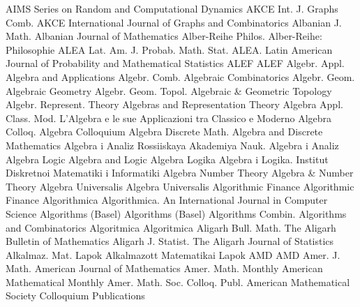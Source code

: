 {AIMS Series on Random and Computational Dynamics}
{AKCE Int. J. Graphs Comb.}
{AKCE International Journal of Graphs and Combinatorics}
{Albanian J. Math.}
{Albanian Journal of Mathematics}
{Alber-Reihe Philos.}
{Alber-Reihe: Philosophie}
{ALEA Lat. Am. J. Probab. Math. Stat.}
{ALEA. Latin American Journal of Probability and Mathematical Statistics}
{ALEF}
{ALEF}
{Algebr. Appl.}
{Algebra and Applications}
{Algebr. Comb.}
{Algebraic Combinatorics}
{Algebr. Geom.}
{Algebraic Geometry}
{Algebr. Geom. Topol.}
{Algebraic & Geometric Topology}
{Algebr. Represent. Theory}
{Algebras and Representation Theory}
{Algebra Appl. Class. Mod.}
{L'Algebra e le sue Applicazioni tra Classico e Moderno}
{Algebra Colloq.}
{Algebra Colloquium}
{Algebra Discrete Math.}
{Algebra and Discrete Mathematics}
{Algebra i Analiz}
{Rossiiskaya Akademiya Nauk. Algebra i Analiz}
{Algebra Logic}
{Algebra and Logic}
{Algebra Logika}
{Algebra i Logika. Institut Diskretnoi Matematiki i Informatiki}
{Algebra Number Theory}
{Algebra & Number Theory}
{Algebra Universalis}
{Algebra Universalis}
{Algorithmic Finance}
{Algorithmic Finance}
{Algorithmica}
{Algorithmica. An International Journal in Computer Science}
{Algorithms (Basel)}
{Algorithms (Basel)}
{Algorithms Combin.}
{Algorithms and Combinatorics}
{Algoritmica}
{Algoritmica}
{Aligarh Bull. Math.}
{The Aligarh Bulletin of Mathematics}
{Aligarh J. Statist.}
{The Aligarh Journal of Statistics}
{Alkalmaz. Mat. Lapok}
{Alkalmazott Matematikai Lapok}
{AMD}
{AMD}
{Amer. J. Math.}
{American Journal of Mathematics}
{Amer. Math. Monthly}
{American Mathematical Monthly}
{Amer. Math. Soc. Colloq. Publ.}
{American Mathematical Society Colloquium Publications}
